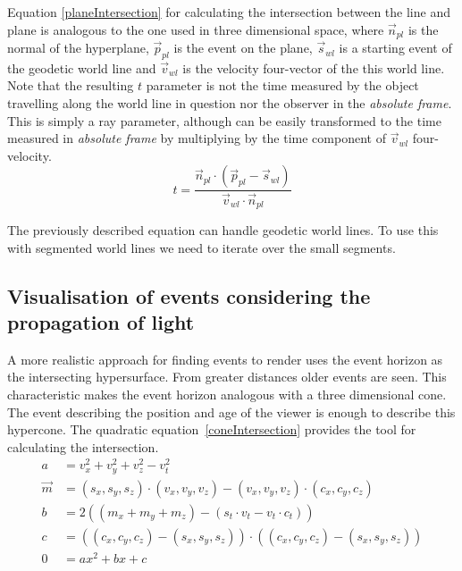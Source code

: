 \documentclass{egpubl}
\begin{document}
Equation \ref{planeIntersection} for calculating the intersection between the line and plane is analogous to the one used in three dimensional space, where $\vec{n}_{pl}$ is the normal of the hyperplane, $\vec{p}_{pl}$ is the event on the plane, $\vec{s}_{wl}$ is a starting event of the geodetic world line and $\vec{v}_{wl}$ is the velocity four-vector of the this world line. Note that the resulting $t$ parameter is not the time measured by the object travelling along the world line in question nor the observer in the \emph{absolute frame}. This is simply a ray parameter, although can be easily transformed to the time measured in \emph{absolute frame} by multiplying by the time component of $\vec{v}_{wl}$ four-velocity.
\begin{equation}
\label{planeIntersection}
t = \frac{\vec{n}_{pl}\cdot(\vec{p}_{pl} - \vec{s}_{wl})}{\vec{v}_{wl}\cdot\vec{n}_{pl}}
\end{equation}

The previously described equation can handle geodetic world lines. To use this with segmented world lines we need to iterate over the small segments. 

\subsection{Visualisation of events considering the propagation of light}
\label{visConsLight}
A more realistic approach for finding events to render uses the event horizon as the intersecting hypersurface. From greater distances older events are seen. This characteristic makes the event horizon analogous with a three dimensional cone. The  event describing the position and age of the viewer is enough to describe this hypercone. The quadratic equation~\ref{coneIntersection} provides the tool for calculating the intersection.
\begin{equation}
\label{coneIntersection}
\begin{aligned}
a &= v_x^2 + v_y^2 + v_z^2 - v_t^2\\
\vec{m} &= (s_x, s_y, s_z)\cdot{}(v_x, v_y, v_z) - (v_x, v_y, v_z)\cdot{}(c_x, c_y, c_z)\\
b &= 2((m_x + m_y + m_z) - (s_t\cdot{}v_t - v_t\cdot{}c_t))\\
c &= ((c_x, c_y, c_z) - (s_x, s_y, s_z))\cdot{}((c_x, c_y, c_z) - (s_x, s_y, s_z))\\
0 &=ax^2 + bx + c
\end{aligned}
\end{equation}
\end{document}
